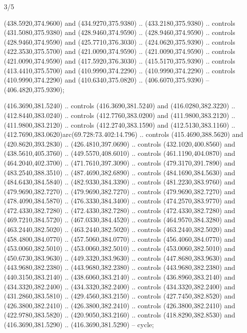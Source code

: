 \begin{flagdescription}{3/5}
\begin{scope}[shift={(0.5\flaglength,0.5\flagwidth)},scale=\flagwidth/510]
\begin{scope}[y=0.80pt, x=0.80pt, yscale=-1.06, xscale=1.06,yshift=-240pt,xshift=-400pt]
\begin{scope}[cm={{0.83333,0.0,0.0,0.83333,(154.64672,48.64761)}}]
\begin{scope}[cm={{0.93334,0.0,0.0,0.93334,(-4.86471,22.64035)}}]
\begin{scope}[draw=black]
\begin{scope}[line width=0.488\lw]
  (438.5920,374.9600) and (434.9270,375.9380) .. (433.2180,375.9380) .. controls
  (431.5080,375.9380) and (428.9460,374.9590) .. (428.9460,374.9590) .. controls
  (428.9460,374.9590) and (425.7710,376.3030) .. (424.0620,375.9390) .. controls
  (422.3530,375.5700) and (421.0090,374.9590) .. (421.0090,374.9590) .. controls
  (421.0090,374.9590) and (417.5920,376.3030) .. (415.5170,375.9390) .. controls
  (413.4410,375.5700) and (410.9990,374.2290) .. (410.9990,374.2290) .. controls
  (410.9990,374.2290) and (410.6340,375.0820) .. (406.6070,375.9390) --
  (406.4820,375.9390);
\begin{scope}[fill=c006ac8,line width=0.586\lw]
 (416.3690,381.5240) .. controls (416.3690,381.5240) and
  (416.0280,382.3220) .. (412.8440,383.0240) .. controls (412.7760,383.0200) and
  (411.9800,383.2120) .. (411.9800,383.2120) .. controls (412.2740,383.1590) and
  (412.5130,383.1160) .. (412.7690,383.0620)arc(69.728:73.402:14.796) ..
  controls (415.4690,388.5620) and (420.8620,393.2830) .. (426.4810,397.0690) ..
  controls (432.1020,400.8560) and (438.5610,405.3760) .. (449.5570,408.6010) ..
  controls (461.1190,404.0870) and (464.2040,402.3700) .. (471.7610,397.3090) ..
  controls (479.3170,391.7890) and (483.2540,388.3510) .. (487.4690,382.6890) ..
  controls (484.1690,384.5630) and (484.6430,384.5840) .. (482.9330,384.3390) ..
  controls (481.2230,383.9760) and (479.9690,382.7270) .. (479.9690,382.7270) ..
  controls (479.9690,382.7270) and (478.4090,384.5870) .. (476.3330,384.3400) ..
  controls (474.2570,383.9770) and (472.4330,382.7280) .. (472.4330,382.7280) ..
  controls (472.4330,382.7280) and (469.7210,384.5720) .. (467.0330,384.4520) ..
  controls (464.9570,384.3280) and (463.2440,382.5020) .. (463.2440,382.5020) ..
  controls (463.2440,382.5020) and (458.4800,384.0770) .. (457.5060,384.0770) ..
  controls (456.4060,384.0770) and (453.0060,382.5010) .. (453.0060,382.5010) ..
  controls (453.0060,382.5010) and (450.6730,383.9630) .. (449.3320,383.9630) ..
  controls (447.8680,383.9630) and (443.9680,382.2380) .. (443.9680,382.2380) ..
  controls (443.9680,382.2380) and (440.3150,383.2140) .. (438.6060,383.2140) ..
  controls (436.8960,383.2140) and (434.3320,382.2400) .. (434.3320,382.2400) ..
  controls (434.3320,382.2400) and (431.2860,383.5810) .. (429.4560,383.2150) ..
  controls (427.7450,382.8520) and (426.3800,382.2410) .. (426.3800,382.2410) ..
  controls (426.3800,382.2410) and (422.9780,383.5820) .. (420.9050,383.2160) ..
  controls (418.8290,382.8530) and (416.3690,381.5290) .. (416.3690,381.5290) --
  cycle;

\end{scope}
\end{scope}
\end{scope}
\end{scope}
\end{scope}
\end{scope}
\end{scope}
\end{flagdescription}

